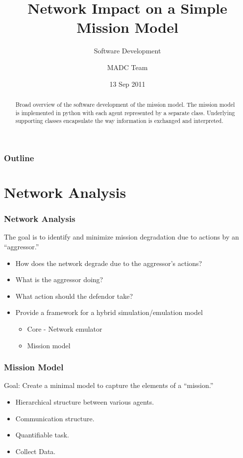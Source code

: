 \documentclass{beamer}
\begin{document}
\title{Network Impact on a Simple Mission Model}
\subtitle{Software Development}
\author{MADC Team}
\date{13 Sep 2011}

\begin{frame}
  \titlepage
  \begin{abstract}
    Broad overview of the software development of the mission
    model. The mission model is implemented in python with each agent
    represented by a separate class. Underlying supporting classes
    encapsulate the way information is exchanged and interpreted.
  \end{abstract}
\end{frame}



\begin{frame}
  \frametitle{Outline}
\end{frame}


\section{Network Analysis}

\begin{frame}
  \frametitle{Network Analysis}
  
  The goal is to identify and minimize mission degradation due to
  actions by an ``aggressor.''  

  \begin{itemize}
  \item How does the network degrade due to the aggressor's actions?
  \item What is the aggressor doing?
  \item What action should the defendor take?
  \item Provide a framework for a hybrid simulation/emulation model
    \begin{itemize}
    \item Core - Network emulator
    \item Mission model 
    \end{itemize}
  \end{itemize}

\end{frame}


\begin{frame}
  \frametitle{Mission Model}

  Goal: Create a minimal model to capture the elements of a
  ``mission.''

  \begin{itemize}
  \item Hierarchical structure between various agents.
  \item Communication structure.
  \item Quantifiable task.
  \item Collect Data.
  \end{itemize}

\end{frame}
\end{document}
